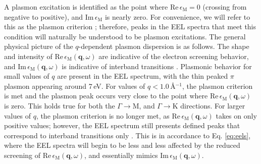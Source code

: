 \documentclass[aps,prb,10pt,showpacs,superscriptaddress,twocolumn,notitlepage]{revtex4-1}
\begin{document}
A plasmon excitation is identified as the point where
$\mathrm{Re}\,\epsilon_{\mathrm{M}} = 0$ (crossing from negative to positive),
and $\mathrm{Im}\,\epsilon_{\mathrm{M}}$ is nearly zero. For convenience, we will
refer to this as the plasmon criterion \cite{jonesbookv11973}; therefore, peaks
in the EEL spectra that meet this condition will naturally be understood to be
plasmon excitations.
The general physical picture of the $q$-dependent plasmon dispersion is as
follows. The shape and intensity of
$\mathrm{Re}\,\epsilon_{\mathrm{M}}(\mathbf{q}, \omega)$ are indicative of the
electron screening behavior, and $\mathrm{Im}\,\epsilon_{\mathrm{M}}(\mathbf{q},
\omega)$ is indicative of interband transitions \cite{marinopoulosPRB04}.
Plasmonic behavior for small values of $q$ are present in the EEL spectrum, with
the thin peaked $\pi$ plasmon appearing around 7\,eV.
For values of $q < 1.0$\,\r{A}$^{-1}$,
the plasmon criterion is met and the plasmon peak occurs very close to the point
where $\mathrm{Re}\,\epsilon_{\mathrm{M}}(\mathbf{q}, \omega)$ is zero. This
holds true for both the $\Gamma \rightarrow \mathrm{M}$, and $\Gamma
\rightarrow \mathrm{K}$ directions. For larger values of $q$, the plasmon
criterion is no longer met, as $\mathrm{Re}\,\epsilon_{\mathrm{M}}(\mathbf{q},
\omega)$ takes on only positive values; however, the EEL spectrum still presents
defined peaks that correspond to interband transitions only
\cite{marinopoulosPRB04}. This is in accordance to Eq. \eqref{eq:eels}, where the
EEL spectra will begin to be less and less affected by the reduced screening of
$\mathrm{Re}\,\epsilon_{\mathrm{M}}(\mathbf{q}, \omega)$, and essentially mimics
$\mathrm{Im}\,\epsilon_{\mathrm{M}}(\mathbf{q}, \omega)$. 


\end{document}
